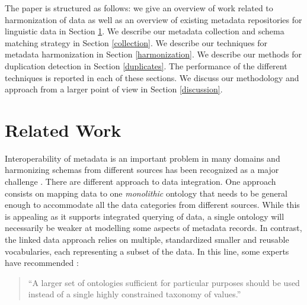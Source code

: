 \documentclass[11pt]{article}
\begin{document}
The paper is structured as follows: we give an overview of work related to
harmonization of data as well as an overview of existing metadata repositories
for linguistic data in Section \ref{rel_work}. We describe our metadata
collection and schema matching strategy in Section \ref{collection}. We describe
our techniques for metadata harmonization in Section \ref{harmonization}. We
describe our methods for duplication detection in Section \ref{duplicates}. The
performance of the different techniques is reported in each of these sections.
We discuss our methodology and approach from a larger point of view in Section
\ref{discussion}. 


\section{Related Work}

\label{rel_work}

Interoperability of metadata is an important problem in many domains and
harmonizing schemas from different sources has been recognized as a major
challenge 
\cite{nilsson2010interoperability,khoo2010merging,nogueras2004metadata}. 
There are different approach to data integration. One approach consists on
mapping data to one \emph{monolithic} ontology that needs to be general enough
to accommodate all the data categories from different sources. While this is 
appealing as it supports integrated querying of data, a
single ontology will necessarily be weaker at modelling some aspects of metadata
records. In contrast, the linked data approach relies on
multiple, standardized smaller and reusable vocabularies, each representing a 
subset of the data.  In this line, some experts have recommended \cite{brooks2006towards}:

\begin{quote}
``A larger set of ontologies sufficient for particular purposes should
be used instead of a single highly constrained taxonomy of values.''
\end{quote}

\end{document}
